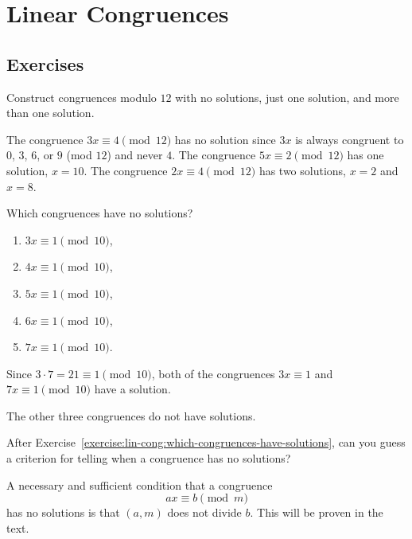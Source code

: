 \chapter{Linear Congruences}

\section{Exercises}

 Construct congruences modulo $12$ with no solutions, just
one solution, and more than one solution.
\begin{solution}
  The congruence $3x\equiv4\pmod{12}$ has no solution since $3x$ is
  always congruent to $0$, $3$, $6$, or $9$ (mod $12$) and never
  $4$. The congruence $5x\equiv2\pmod{12}$ has one solution, $x =
  10$. The congruence $2x\equiv4\pmod{12}$ has two solutions, $x = 2$
  and $x = 8$.
\end{solution}

 Which congruences have no solutions?
\label{exercise:lin-cong:which-congruences-have-solutions}
\begin{enumerate}
\item $3x\equiv1\pmod{10}$,
\item $4x\equiv1\pmod{10}$,
\item $5x\equiv1\pmod{10}$,
\item $6x\equiv1\pmod{10}$,
\item $7x\equiv1\pmod{10}$.
\end{enumerate}
\begin{solution}
  Since $3\cdot7 = 21\equiv1\pmod{10}$, both of the congruences
  $3x\equiv1$ and $7x\equiv1\pmod{10}$ have a solution.

  The other three congruences do not have solutions.
\end{solution}

 After
Exercise~\ref{exercise:lin-cong:which-congruences-have-solutions}, can
you guess a criterion for telling when a congruence has no solutions?
\begin{solution}
  A necessary and sufficient condition that a congruence
  \begin{equation*}
    ax\equiv b\pmod{m}
  \end{equation*}
  has no solutions is that $(a,m)$ does not divide $b$. This will be
  proven in the text.
\end{solution}

